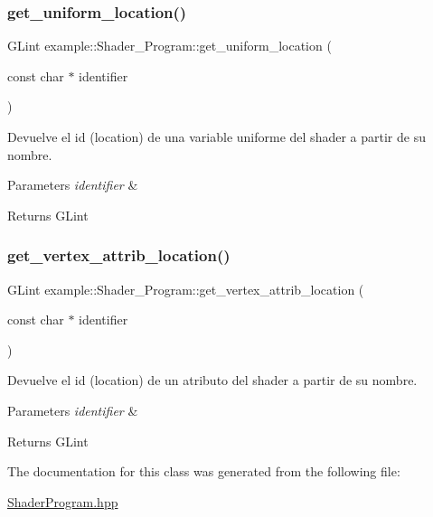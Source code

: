 \subsubsection{\texorpdfstring{get\_uniform\_location()}{get\_uniform\_location()}}
{\footnotesize\ttfamily G\+Lint example\+::\+Shader\+\_\+\+Program\+::get\+\_\+uniform\+\_\+location (\begin{DoxyParamCaption}\item[{const char $\ast$}]{identifier }\end{DoxyParamCaption})\hspace{0.3cm}{\ttfamily [inline]}}



Devuelve el id (location) de una variable uniforme del shader a partir de su nombre. 


\begin{DoxyParams}{Parameters}
{\em identifier} & \\
\hline
\end{DoxyParams}
\begin{DoxyReturn}{Returns}
G\+Lint 
\end{DoxyReturn}
\mbox{\label{classexample_1_1_shader___program_a456f2b6cee0125a6f02816b02d6ed702}} 
\subsubsection{\texorpdfstring{get\_vertex\_attrib\_location()}{get\_vertex\_attrib\_location()}}
{\footnotesize\ttfamily G\+Lint example\+::\+Shader\+\_\+\+Program\+::get\+\_\+vertex\+\_\+attrib\+\_\+location (\begin{DoxyParamCaption}\item[{const char $\ast$}]{identifier }\end{DoxyParamCaption})\hspace{0.3cm}{\ttfamily [inline]}}



Devuelve el id (location) de un atributo del shader a partir de su nombre. 


\begin{DoxyParams}{Parameters}
{\em identifier} & \\
\hline
\end{DoxyParams}
\begin{DoxyReturn}{Returns}
G\+Lint 
\end{DoxyReturn}


The documentation for this class was generated from the following file\+:\begin{DoxyCompactItemize}
\item 
\mbox{\hyperlink{_shader_program_8hpp}{Shader\+Program.\+hpp}}\end{DoxyCompactItemize}
